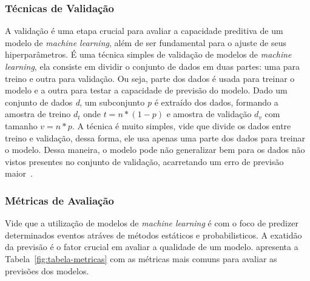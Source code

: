         \subsubsection{Técnicas de Validação}
        A validação é uma etapa crucial para avaliar a capacidade preditiva de um modelo de 
        \emph{machine learning}, além de ser fundamental para o ajuste de seus hiperparâmetros.
                É uma técnica simples de validação de modelos de \emph{machine learning}, ela consiste em dividir
                o conjunto de dados em duas partes: uma para treino e outra para validação. Ou seja, parte dos 
                dados é usada para treinar o modelo e a outra para testar a capacidade de previsão do modelo. 
                Dado um conjunto de dados \emph{d}, um subconjunto \emph{p} é extraído dos dados, formando 
                a amostra de treino \(d_t\) onde \(t = n * (1 - p)\) e amostra de validação \(d_v\) com tamanho
                \(v = n * p\). 
                A técnica é muito simples, vide que divide os dados entre treino e validação, dessa forma, ele
                usa apenas uma parte dos dados para treinar o modelo. Dessa maneira, o modelo pode não generalizar
                bem para os dados não vistos presentes no conjunto de validação, acarretando um erro de previsão
                maior~\cite{cunha2019}.


        \subsubsection{Métricas de Avaliação}
            Vide que a utilização de modelos de \emph{machine learning} é com o foco de predizer determinados eventos atráves
            de métodos estáticos e probabilisticos. A exatidão da previsão é o fator crucial em avaliar a qualidade de um modelo.
             apresenta a Tabela~\ref{fig:tabela-metricas} com as métricas mais comuns para avaliar as previsões
            dos modelos.
            
